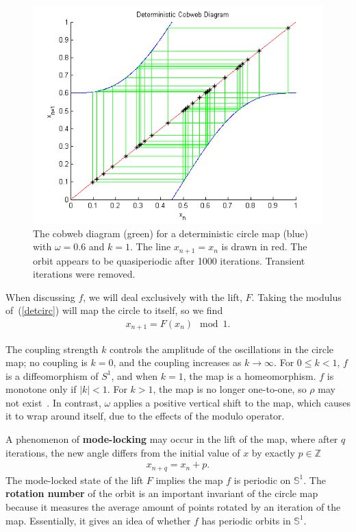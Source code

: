\begin{figure}[!h]
\caption[Deterministic circle map, quasiperiodic orbit]{The cobweb
  diagram (green) for a deterministic circle map (blue) with $\omega =
  0.6$ and $k=1$. The line $x_{n+1}=x_n$ is drawn in red. The orbit
  appears to be quasiperiodic after 1000 iterations. Transient iterations were removed.}\label{fig:rcircunstable}
	\begin{center}
		\includegraphics[scale=0.7]{figs/detcirc_cobweb_chaos.png}
	\end{center}
\end{figure}
When discussing $f$, we will deal exclusively with the
lift, $F$. Taking the modulus of~(\ref{detcirc}) will map the circle
to itself, so we find
\begin{align*}
x_{n+1}= F(x_n) \mod 1.
\end{align*}

The coupling strength $k$
controls the amplitude of the oscillations in the circle map; no
coupling is $k=0$, and the coupling increases as $k \to
\infty$. For $0 \leq k < 1$, $f$ is a diffeomorphism of $S^1$, and
when $k=1$, the map is a homeomorphism. $f$ is monotone only if $|k|<1$. For $k>1$, the map is no
longer one-to-one, so $\rho$ may not exist~\cite{devaney}. In contrast, $\omega$
applies a positive vertical shift to the map, which causes it to wrap
around itself, due to the effects of the modulo operator. 

A phenomenon of \textbf{mode-locking} may occur in the lift of the map,
where after $q$ iterations, the new angle differs from the initial
value of $x$ by exactly $p \in \mathbb{Z}$
\begin{align*}
x_{n+q}=x_n+p.
\end{align*}
The mode-locked state of the lift $F$ implies the map $f$ is periodic
on $\mathbb{S}^1$. The \textbf{rotation number} of the orbit is an important invariant of
the circle map because it measures the average amount of points
rotated by an iteration of the map. Essentially, it gives an idea of
whether $f$ has periodic orbits in $\mathbb{S}^1$.

